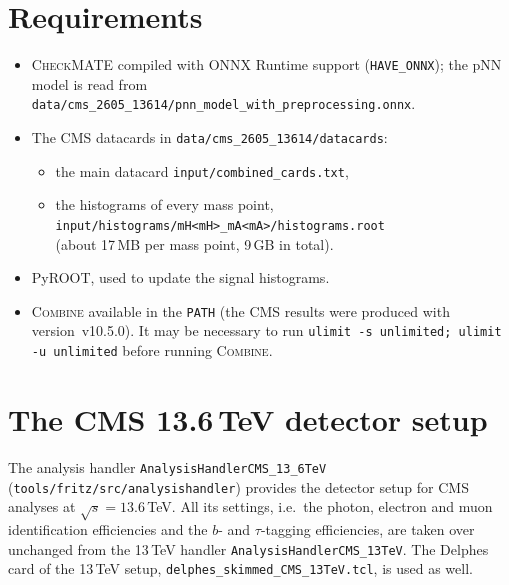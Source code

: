 \documentclass[11pt,a4paper]{article}
\newcommand{\cm}{\textsc{CheckMATE}}
\newcommand{\combine}{\textsc{Combine}}
\newcommand{\file}[1]{\texttt{#1}}
\begin{document}
\section{Requirements}

\begin{itemize}
  \item \cm{} compiled with ONNX Runtime support (\texttt{HAVE\_ONNX}); the
        pNN model is read from
        \file{data/cms\_2605\_13614/pnn\_model\_with\_preprocessing.onnx}.
  \item The CMS datacards in \file{data/cms\_2605\_13614/datacards}:
        \begin{itemize}
          \item the main datacard \file{input/combined\_cards.txt},
          \item the histograms of every mass point,\\
                \file{input/histograms/mH<mH>\_mA<mA>/histograms.root}\\
                (about 17\,MB per mass point, 9\,GB in total).
        \end{itemize}
  \item PyROOT, used to update the signal histograms.
  \item \combine{} available in the \texttt{PATH} (the CMS results were
        produced with version~v10.5.0). It may be necessary to run
        \texttt{ulimit -s unlimited; ulimit -u unlimited} before running
        \combine{}.
\end{itemize}

\section{The CMS 13.6\,TeV detector setup}

The analysis handler \file{AnalysisHandlerCMS\_13\_6TeV}
(\file{tools/fritz/src/analysishandler}) provides the detector setup for
CMS analyses at $\sqrt{s}=13.6$\,TeV. All its settings, i.e.\ the photon,
electron and muon identification efficiencies and the $b$- and $\tau$-tagging
efficiencies, are taken over unchanged from the 13\,TeV handler
\file{AnalysisHandlerCMS\_13TeV}. The Delphes card of the 13\,TeV setup,
\file{delphes\_skimmed\_CMS\_13TeV.tcl}, is used as well.
\end{document}
